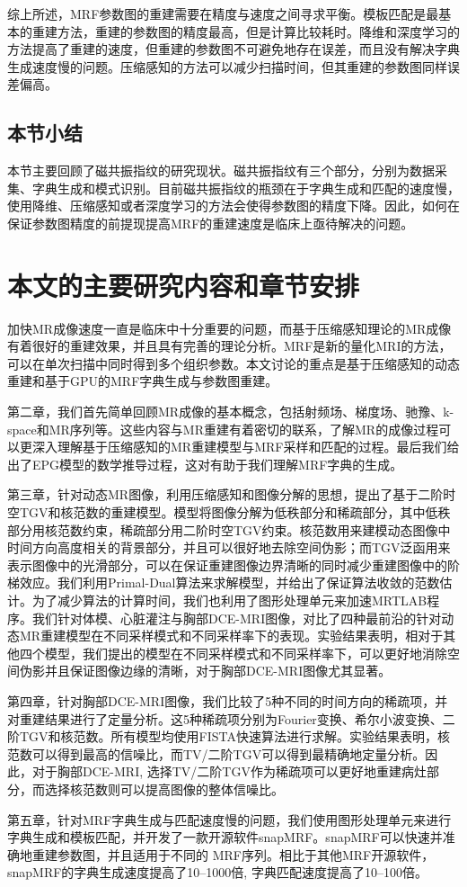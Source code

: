 综上所述，MRF参数图的重建需要在精度与速度之间寻求平衡。模板匹配是最基本的重建方法，重建的参数图的精度最高，但是计算比较耗时。降维和深度学习的方法提高了重建的速度，但重建的参数图不可避免地存在误差，而且没有解决字典生成速度慢的问题。压缩感知的方法可以减少扫描时间，但其重建的参数图同样误差偏高。

\subsection{本节小结}
本节主要回顾了磁共振指纹的研究现状。磁共振指纹有三个部分，分别为数据采集、字典生成和模式识别。目前磁共振指纹的瓶颈在于字典生成和匹配的速度慢，使用降维、压缩感知或者深度学习的方法会使得参数图的精度下降。因此，如何在保证参数图精度的前提现提高MRF的重建速度是临床上亟待解决的问题。

\section{本文的主要研究内容和章节安排}
加快MR成像速度一直是临床中十分重要的问题，而基于压缩感知理论的MR成像有着很好的重建效果，并且具有完善的理论分析。MRF是新的量化MRI的方法，可以在单次扫描中同时得到多个组织参数。本文讨论的重点是基于压缩感知的动态重建和基于GPU的MRF字典生成与参数图重建。

第二章，我们首先简单回顾MR成像的基本概念，包括射频场、梯度场、驰豫、k-space和MR序列等。这些内容与MR重建有着密切的联系，了解MR的成像过程可以更深入理解基于压缩感知的MR重建模型与MRF采样和匹配的过程。最后我们给出了EPG模型的数学推导过程，这对有助于我们理解MRF字典的生成。

第三章，针对动态MR图像，利用压缩感知和图像分解的思想，提出了基于二阶时空TGV和核范数的重建模型。模型将图像分解为低秩部分和稀疏部分，其中低秩部分用核范数约束，稀疏部分用二阶时空TGV约束。核范数用来建模动态图像中时间方向高度相关的背景部分，并且可以很好地去除空间伪影；而TGV泛函用来表示图像中的光滑部分，可以在保证重建图像边界清晰的同时减少重建图像中的阶梯效应。我们利用Primal-Dual算法来求解模型，并给出了保证算法收敛的范数估计。为了减少算法的计算时间，我们也利用了图形处理单元来加速MRTLAB程序。我们针对体模、心脏灌注与胸部DCE-MRI图像，对比了四种最前沿的针对动态MR重建模型在不同采样模式和不同采样率下的表现。实验结果表明，相对于其他四个模型，我们提出的模型在不同采样模式和不同采样率下，可以更好地消除空间伪影并且保证图像边缘的清晰，对于胸部DCE-MRI图像尤其显著。

第四章，针对胸部DCE-MRI图像，我们比较了5种不同的时间方向的稀疏项，并对重建结果进行了定量分析。这5种稀疏项分别为Fourier变换、希尔小波变换、二阶TGV和核范数。所有模型均使用FISTA快速算法进行求解。实验结果表明，核范数可以得到最高的信噪比，而TV/二阶TGV可以得到最精确地定量分析。因此，对于胸部DCE-MRI, 选择TV/二阶TGV作为稀疏项可以更好地重建病灶部分，而选择核范数则可以提高图像的整体信噪比。

第五章，针对MRF字典生成与匹配速度慢的问题，我们使用图形处理单元来进行字典生成和模板匹配，并开发了一款开源软件snapMRF。snapMRF可以快速并准确地重建参数图，并且适用于不同的 MRF序列。相比于其他MRF开源软件，snapMRF的字典生成速度提高了10--1000倍, 字典匹配速度提高了10--100倍。







